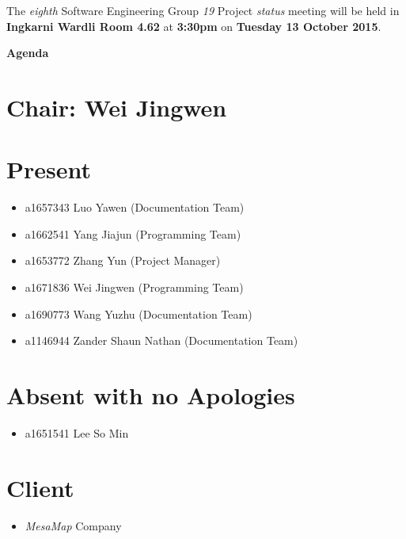 \documentclass[a4paper] {article}
\begin{document}
	
	\vspace*{-50pt}
	
	\noindent The \emph{eighth} Software Engineering Group \emph{19} Project \emph{status} meeting will
	be held in \textbf{Ingkarni Wardli Room 4.62} at \textbf {3:30pm} on \textbf{Tuesday 13 October 2015}.
	
	
	\begin{center}
		\huge \textbf {Agenda}
	\end{center}
	

	\section*{Chair: Wei Jingwen}
	
	\vspace*{10pt}
	
	\section{Present}
	\begin{itemize}
		\item a1657343 Luo Yawen (Documentation Team)
		\item a1662541 Yang Jiajun (Programming Team)
		\item a1653772 Zhang Yun (Project Manager)
		\item a1671836 Wei Jingwen (Programming Team)
		\item a1690773 Wang Yuzhu (Documentation Team)
		\item a1146944 Zander Shaun Nathan (Documentation Team)
	\end{itemize}
	
	\section{Absent with no Apologies}
	\begin{itemize}
		\item a1651541 Lee So Min
	\end{itemize}  
	
        \section{Client}
        \begin{itemize}
            \item \emph{MesaMap} Company
        \end{itemize} 
	
\end{document}
